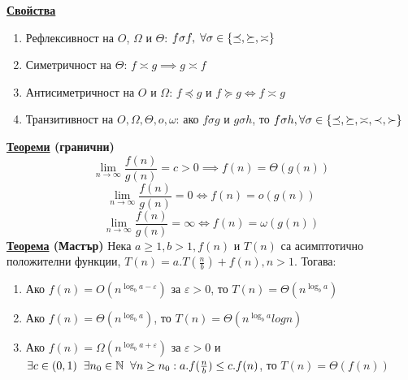 \documentclass{article}
\begin{document}
\textbf{\underline{Свойства}}
\begin{enumerate}
    \item Рефлексивност на $O$, $\Omega$ и $\Theta$: $f \sigma f, \hspace{0.1cm} \forall \sigma \in \{\preceq, \succeq, \asymp\}$
    \item Симетричност на $\Theta$: $f \asymp g \implies g \asymp f$
    \item Антисиметричност на $O$ и $\Omega$: $f \preceq g$ и $f \succeq g \iff f \asymp g$
    \item Транзитивност на $O, \Omega, \Theta, o, \omega$: ако $f \sigma g$ и $g \sigma h$, то $f \sigma h, \hspace{0.1cm} \newline \forall \sigma \in
    \{\preceq, \succeq, \asymp, \prec, \succ\}$
\end{enumerate}
\textbf{\underline{Теореми} (гранични)}
$$\lim_{n \rightarrow \infty}\frac{f(n)}{g(n)} = c > 0 \implies f(n) = \Theta(g(n))$$
$$\lim_{n \rightarrow \infty}\frac{f(n)}{g(n)} = 0 \iff f(n) = o(g(n))$$
$$\lim_{n \rightarrow \infty}\frac{f(n)}{g(n)} = \infty \iff f(n) = \omega(g(n))$$
\textbf{\underline{Теорема} (Мастър)} \newline
Нека $a \ge 1, b > 1, f(n)$ и $T(n)$ са асимптотично положителни функции, $T(n) = a.T(\frac{n}{b}) + f(n), n > 1$. Тогава:
\begin{enumerate}
    \item Ако $f(n) = O(n^{\log_ba - \varepsilon})$ за $\varepsilon > 0$, то $T(n) = \Theta(n^{\log_ba})$
    \item Ако $f(n) = \Theta(n^{\log_ba})$, то $T(n) = \Theta(n^{\log_ba}logn)$
    \item Ако $f(n) = \Omega(n^{\log_ba + \varepsilon})$ за $\varepsilon > 0$ и $\exists c \in (0, 1) \hspace{0.2cm}
    \exists n_0 \in \mathbb{N} \hspace{0.2cm} \forall n \ge n_0 : a.f(\frac{n}{b}) \le c.f(n)$, то $T(n) = \Theta(f(n))$
\end{enumerate}
\end{document}
